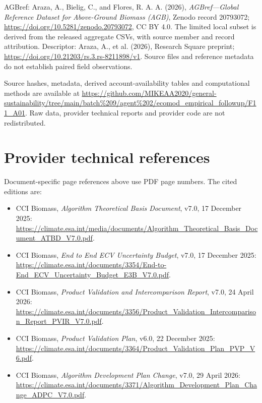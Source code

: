 \documentclass[11pt,a4paper]{article}
\begin{document}
AGBref: Araza, A., Bielig, C., and Flores, R. A. A. (2026), \emph{AGBref---Global Reference Dataset for Above-Ground Biomass (AGB)}, Zenodo record 20793072; \url{https://doi.org/10.5281/zenodo.20793072}, CC BY 4.0. The limited local subset is derived from the released aggregate CSVs, with source member and record attribution. Descriptor: Araza, A., et al. (2026), Research Square preprint; \url{https://doi.org/10.21203/rs.3.rs-8211898/v1}. Source files and reference metadata do not establish paired field observations.

Source hashes, metadata, derived account-availability tables and computational methods are available at \url{https://github.com/MIKEAA2020/general-sustainability/tree/main/batch%209/agent%202/ecomod_empirical_followup/F11_A01}. Raw data, provider technical reports and provider code are not redistributed.


\section{Provider technical references}
Document-specific page references above use PDF page numbers. The cited editions are:
\begin{itemize}
\item CCI Biomass, \emph{Algorithm Theoretical Basis Document}, v7.0, 17 December 2025: \url{https://climate.esa.int/media/documents/Algorithm_Theoretical_Basis_Document_ATBD_V7.0.pdf}.
\item CCI Biomass, \emph{End to End ECV Uncertainty Budget}, v7.0, 17 December 2025: \url{https://climate.esa.int/documents/3354/End-to-End_ECV_Uncertainty_Budget_E3B_V7.0.pdf}.
\item CCI Biomass, \emph{Product Validation and Intercomparison Report}, v7.0, 24 April 2026: \url{https://climate.esa.int/documents/3356/Product_Validation_Intercomparison_Report_PVIR_V7.0.pdf}.
\item CCI Biomass, \emph{Product Validation Plan}, v6.0, 22 December 2025: \url{https://climate.esa.int/documents/3364/Product_Validation_Plan_PVP_V6.pdf}.
\item CCI Biomass, \emph{Algorithm Development Plan Change}, v7.0, 29 April 2026: \url{https://climate.esa.int/documents/3371/Algorithm_Development_Plan_Change_ADPC_V7.0.pdf}.
\end{itemize}
\end{document}
